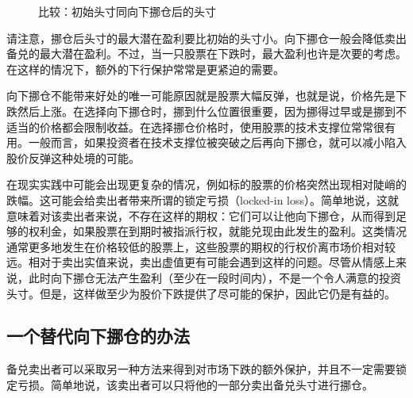 \begin{figure}
    \centering
    \caption{比较：初始头寸同向下挪仓后的头寸}
    \label{fig2.3}
\end{figure}
请注意，挪仓后头寸的最大潜在盈利要比初始的头寸小。向下挪仓一般会降低卖出备兑的最大潜在盈利。不过，当一只股票在下跌时，最大盈利也许是次要的考虑。在这样的情况下，额外的下行保护常常是更紧迫的需要。

向下挪仓不能带来好处的唯一可能原因就是股票大幅反弹，也就是说，价格先是下跌然后上涨。在选择向下挪仓时，挪到什么位置很重要，因为挪得过早或是挪到不适当的价格都会限制收益。在选择挪仓价格时，使用股票的技术支撑位常常很有用。一般而言，如果投资者在技术支撑位被突破之后再向下挪仓，就可以减小陷入股价反弹这种处境的可能。

在现实实践中可能会出现更复杂的情况，例如标的股票的价格突然出现相对陡峭的跌幅。这可能会给卖出者带来所谓的锁定亏损（locked-in loss）。简单地说，这就意味着对该卖出者来说，不存在这样的期权：它们可以让他向下挪仓，从而得到足够的权利金，如果股票在到期时被指派行权，就能兑现由此发生的盈利。这类情况通常更多地发生在价格较低的股票上，这些股票的期权的行权价离市场价相对较远。相对于卖出实值来说，卖出虚值更有可能会遇到这样的问题。尽管从情感上来说，此时向下挪仓无法产生盈利（至少在一段时间内），不是一个令人满意的投资头寸。但是，这样做至少为股价下跌提供了尽可能的保护，因此它仍是有益的。

\subsection{一个替代向下挪仓的办法}
备兑卖出者可以采取另一种方法来得到对市场下跌的额外保护，并且不一定需要锁定亏损。简单地说，该卖出者可以只将他的一部分卖出备兑头寸进行挪仓。


